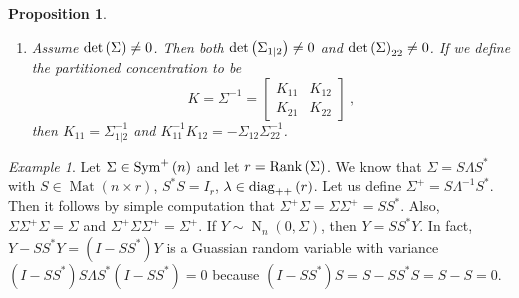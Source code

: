 \documentclass[12pt,a4paper]{amsart}
\newcommand{\MRof}[2]{\operatorname{Mat}\left(#1\times#2\right)}
\newcommand{\gaussian}[3]{\operatorname{N}_{#1}\left(#2,#3\right)}
\newcommand{\ppdiag}[1]{\diag_{++}\left(#1\right)}
\theoremstyle{plain}%
\newtheorem{proposition}[thm]{Proposition}
\theoremstyle{definition}
\theoremstyle{remark}
\newtheorem{example}{Example}
\begin{document}
\begin{proposition}
\begin{enumerate}
\begin{multline*}
\begin{bmatrix}
    I & -\Sigma_{12}\Sigma_{22}^+ \\ 0 & I
  \end{bmatrix}
  \begin{bmatrix}
      \Sigma_{11} & \Sigma_{12} \\ \Sigma_{21} & \Sigma_{22}
    \end{bmatrix}
  \begin{bmatrix}
    I & 0 \\ -\Sigma_{22}^+\Sigma_{21} & I
  \end{bmatrix} = 
\\
   \begin{bmatrix}
    \Sigma_{11} - \Sigma_{12}\Sigma_{22}^+ \Sigma_{21} & 0 \\ \Sigma_{21} & \Sigma_{22}
  \end{bmatrix}
  \begin{bmatrix}
    I & 0 \\ -\Sigma_{22}^+\Sigma_{21} & I
  \end{bmatrix} =  \\
  \begin{bmatrix}
    \Sigma_{11} - \Sigma_{12}\Sigma_{22}^+\Sigma_{21} & 0 \\ 0 & \Sigma_{22}
  \end{bmatrix} \ ,
\end{multline*}
hence the last matrix is non-negative definite. The Shur complement of the partitioned covariance matrix $\Sigma$ is 
\begin{equation*}
  \Sigma_{1|2} = \Sigma_{11} - \Sigma_{12}\Sigma_{22}^+ \Sigma_{21} \in \psym {n_1}\ .
\end{equation*}

\item Assume $\operatorname{det}\left(\Sigma\right) \ne 0$. Then both $\operatorname{det}\left(\Sigma_{1|2}\right) \ne 0$ and $\operatorname{det}\left(\Sigma\right)_{22} \ne 0$. If we define the partitioned \emph{concentration} to be
  \begin{equation*}
    K = \Sigma^{-1} =
    \begin{bmatrix}
      K_{11} & K_{12} \\ K_{21} & K_{22}
    \end{bmatrix} \ ,
  \end{equation*}
then $K_{11} = \Sigma_{1|2}^{-1}$ and $K_{11}^{-1} K_{12} = - \Sigma_{12}\Sigma_{22}^{-1}$.
\end{enumerate}
\end{proposition}

\begin{example}\label{ex:1}
Let $\Sigma \in \operatorname{Sym}^{+}\left(n\right)$ and let $r = \operatorname{Rank}\left(\Sigma\right)$. We know that $\Sigma = S\Lambda S^*$ with $S \in \MRof n r$, $S^*S = I_r$, $\lambda \in \ppdiag r$. Let us define $\Sigma^+ = S \Lambda^{-1} S^*$. Then it follows by simple computation that  $\Sigma^+\Sigma=\Sigma\Sigma^+ = SS^*$. Also, $\Sigma\Sigma^+\Sigma = \Sigma$ and $\Sigma^+\Sigma\Sigma^+=\Sigma^+$. If $Y \sim \gaussian n 0 \Sigma$, then $Y = SS^*Y$. In fact, $Y - SS^*Y = (I - SS^*)Y$ is a Guassian random variable with variance $(I - SS^*)S\Lambda S^*(I-SS^*) = 0$ because $(I-SS^*)S = S - S S^* S = S-S = 0$.  
\end{example}
\end{document}
